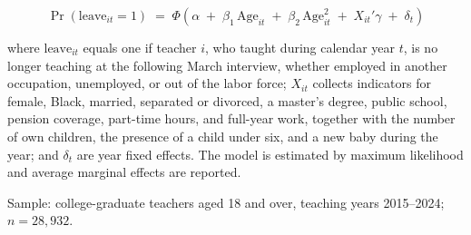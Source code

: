 \documentclass[border=14pt]{standalone}
\begin{document}
\begin{minipage}{15.6cm}
\begin{equation*}
\Pr\left(\text{leave}_{it}=1\right)\;=\;\Phi\!\left(\alpha
\;+\;\beta_{1}\,\text{Age}_{it}\;+\;\beta_{2}\,\text{Age}_{it}^{2}
\;+\;X_{it}'\gamma\;+\;\delta_{t}\right)
\end{equation*}

\vspace{16pt}

\noindent where $\text{leave}_{it}$ equals one if teacher $i$, who taught
during calendar year $t$, is no longer teaching at the following March
interview, whether employed in another occupation, unemployed, or out of
the labor force; $X_{it}$ collects indicators for female, Black, married,
separated or divorced, a master's degree, public school, pension coverage,
part-time hours, and full-year work, together with the number of own
children, the presence of a child under six, and a new baby during the
year; and $\delta_{t}$ are year fixed effects. The model is estimated by
maximum likelihood and average marginal effects are reported.

\vspace{12pt}

\noindent Sample: college-graduate teachers aged 18 and over, teaching
years 2015--2024; $n = 28{,}932$.
\end{minipage}
\end{document}
